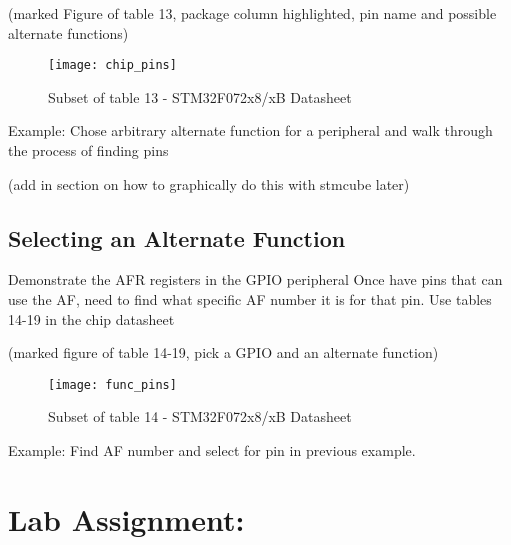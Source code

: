 \documentclass[11pt,fleqn]{book} %
\begin{document}
    (marked Figure of table 13, package column highlighted, pin name and possible alternate functions)
    \begin{figure}[]
        \centering\texttt{[image: chip\_pins]}
        \caption{Subset of table 13 - STM32F072x8/xB Datasheet}
        \label{chip_pins}
    \end{figure}

    \begin{example}
            Example: Chose arbitrary alternate function for a peripheral and walk through the process of finding pins
    \end{example}
    (add in section on how to graphically do this with stmcube later)
    
    \subsection{Selecting an Alternate Function}
    Demonstrate the AFR registers in the GPIO peripheral
    Once have pins that can use the AF, need to find what specific AF number it is for that pin.
    Use tables 14-19 in the chip datasheet
    
    (marked figure of table 14-19, pick a GPIO and an alternate function) 
    \begin{figure}[]
        \centering\texttt{[image: func\_pins]}
        \caption{Subset of table 14 - STM32F072x8/xB Datasheet}
        \label{func_pins}
    \end{figure}
   	
    \begin{example} 
         Example: Find AF number and select for pin in previous example.
    \end{example}
    
\section{Lab Assignment:}
\end{document}
